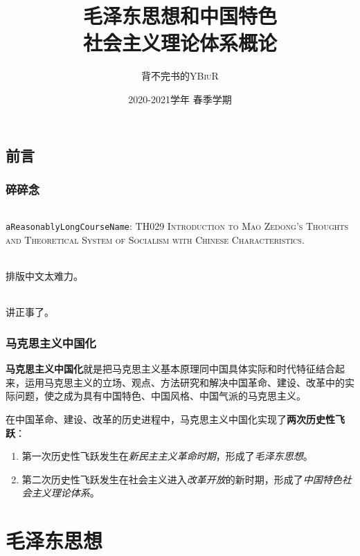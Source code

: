\documentclass[oneside]{book}
\title{\Huge\textbf{毛泽东思想和中国特色\\社会主义理论体系概论}}
\author{背不完书的\textsc{YBiuR}}
\date{2020-2021学年{} 春季学期}
\begin{document}
\begin{spacing}{1.5}
\setlength{\parindent}{2em}

\frontmatter
\maketitle
\chapter*{前言}
\section*{碎碎念}
\paragraph{}\verb|aReasonablyLongCourseName|: \textsc{TH029 Introduction to Mao Zedong's Thoughts and Theoretical System of Socialism with Chinese Characteristics}.
\paragraph{}排版中文太难力。
\paragraph{}讲正事了。


\section*{马克思主义中国化}
    \textbf{马克思主义中国化}就是把马克思主义基本原理同中国具体实际和时代特征结合起来，运用马克思主义的立场、观点、方法研究和解决中国革命、建设、改革中的实际问题，使之成为具有中国特色、中国风格、中国气派的马克思主义。

    在中国革命、建设、改革的历史进程中，马克思主义中国化实现了\textbf{两次历史性飞跃}：
    \begin{enumerate}
        \item 第一次历史性飞跃发生在\emph{新民主主义革命时期}，形成了\emph{毛泽东思想}。
        \item 第二次历史性飞跃发生在社会主义进入\emph{改革开放}的新时期，形成了\emph{中国特色社会主义理论体系}。
    \end{enumerate}


\tableofcontents

\mainmatter
\part{毛泽东思想}





\end{spacing}
\end{document}
